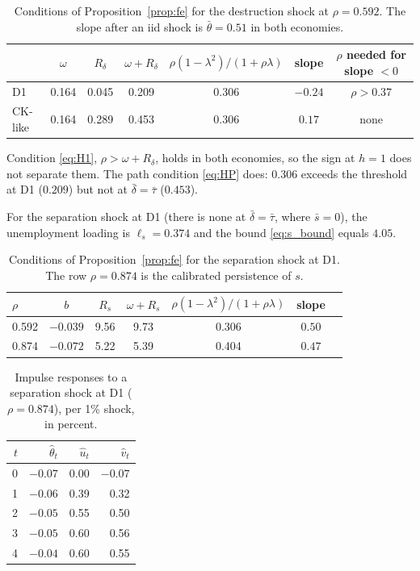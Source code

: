 \documentclass[authoryear, review, 12pt]{elsarticle}
\begin{document}
\begin{table}[h]
\centering
\begin{tabular}{lcccccc}
\toprule
 & $\omega$ & $R_\delta$ & $\omega+R_\delta$ & $\rho(1-\lambda^2)/(1+\rho\lambda)$ & slope & $\rho$ needed for slope $<0$ \\
\midrule
D1 & 0.164 & 0.045 & 0.209 & 0.306 & $-0.24$ & $\rho>0.37$ \\
CK-like & 0.164 & 0.289 & 0.453 & 0.306 & $0.17$ & none \\
\bottomrule
\end{tabular}
\caption{Conditions of Proposition~\ref{prop:fe} for the destruction shock at
$\rho=0.592$. The slope after an iid shock is $\bar\theta=0.51$ in both economies.}
\label{tab:slopes}
\end{table}

Condition \eqref{eq:H1}, $\rho>\omega+R_\delta$, holds in both economies, so the sign at
$h=1$ does not separate them. The path condition \eqref{eq:HP} does: $0.306$ exceeds the
threshold at D1 ($0.209$) but not at $\bar\delta=\bar\tau$ ($0.453$).

For the separation shock at D1 (there is none at $\bar\delta=\bar\tau$, where $\bar s=0$),
the unemployment loading is $\ell_s=0.374$ and the bound \eqref{eq:s_bound} equals $4.05$.

\begin{table}[h]
\centering
\begin{tabular}{lcccccc}
\toprule
$\rho$ & $b$ & $R_s$ & $\omega+R_s$ & $\rho(1-\lambda^2)/(1+\rho\lambda)$ & slope \\
\midrule
0.592 & $-0.039$ & 9.56 & 9.73 & 0.306 & $0.50$ \\
0.874 & $-0.072$ & 5.22 & 5.39 & 0.404 & $0.47$ \\
\bottomrule
\end{tabular}
\caption{Conditions of Proposition~\ref{prop:fe} for the separation shock at D1. The row
$\rho=0.874$ is the calibrated persistence of $s$.}
\label{tab:slopes_s}
\end{table}

\begin{table}[h]
\centering
\begin{tabular}{rrrr}
\toprule
$t$ & $\hat\theta_t$ & $\hat u_t$ & $\hat v_t$ \\
\midrule
0 & $-0.07$ & 0.00 & $-0.07$ \\
1 & $-0.06$ & 0.39 & 0.32 \\
2 & $-0.05$ & 0.55 & 0.50 \\
3 & $-0.05$ & 0.60 & 0.56 \\
4 & $-0.04$ & 0.60 & 0.55 \\
\bottomrule
\end{tabular}
\caption{Impulse responses to a separation shock at D1 ($\rho=0.874$), per 1\% shock, in
percent.}
\label{tab:irf_s}
\end{table}
\end{document}
